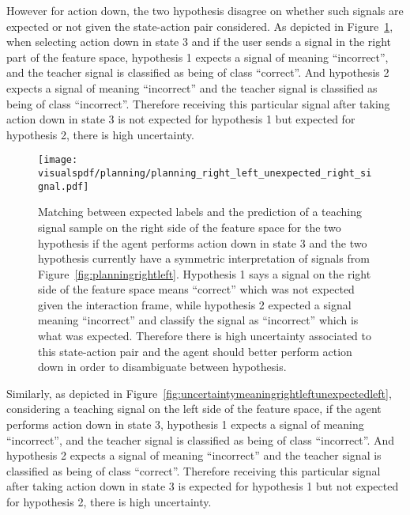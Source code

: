 However for action down, the two hypothesis disagree on whether such signals are expected or not given the state-action pair considered. As depicted in Figure~\ref{fig:uncertaintymeaningrightleftunexpectedright}, when selecting action down in state 3 and if the user sends a signal in the right part of the feature space, hypothesis 1 expects a signal of meaning ``incorrect'', and the teacher signal is classified as being of class ``correct''. And hypothesis 2 expects a signal of meaning ``incorrect'' and the teacher signal is classified as being of class ``incorrect''. Therefore receiving this particular signal after taking action down in state 3 is not expected for hypothesis 1 but expected for hypothesis 2, there is high uncertainty.

\begin{figure}[!htbp]
  \centering
  \texttt{[image: \\visualspdf/planning/planning\_right\_left\_unexpected\_right\_signal.pdf]}
  \caption{Matching between expected labels and the prediction of a teaching signal sample on the right side of the feature space for the two hypothesis if the agent performs action down in state 3 and the two hypothesis currently have a symmetric interpretation of signals from Figure~\ref{fig:planningrightleft}. Hypothesis 1 says a signal on the right side of the feature space means ``correct'' which was not expected given the interaction frame, while hypothesis 2 expected a signal meaning ``incorrect'' and classify the signal as ``incorrect'' which is what was expected. Therefore there is high uncertainty associated to this state-action pair and the agent should better perform action down in order to disambiguate between hypothesis.}
  \label{fig:uncertaintymeaningrightleftunexpectedright}
\end{figure}

Similarly, as depicted in Figure~\ref{fig:uncertaintymeaningrightleftunexpectedleft}, considering a teaching signal on the left side of the feature space, if the agent performs action down in state 3, hypothesis 1 expects a signal of meaning ``incorrect'', and the teacher signal is classified as being of class ``incorrect''. And hypothesis 2 expects a signal of meaning ``incorrect'' and the teacher signal is classified as being of class ``correct''. Therefore receiving this particular signal after taking action down in state 3 is expected for hypothesis 1 but not expected for hypothesis 2, there is high uncertainty.

